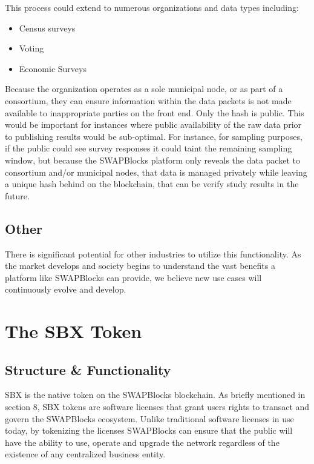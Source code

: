 \documentclass[12pt]{article}
\begin{document}
This process could extend to numerous organizations and data types including:

\begin{itemize}
	\item{Census surveys}
	\item{Voting}
	\item{Economic Surveys}
\end{itemize}

Because the organization operates as a sole municipal node, or as part of a consortium, they can ensure information within 
the data packets is not made available to inappropriate parties on the front end. Only the hash is public. This would be 
important for instances where public availability of the raw data prior to publishing results would be sub-optimal. For instance, 
for sampling purposes, if the public could see survey responses it could taint the remaining sampling window, but because the SWAPBlocks 
platform only reveals the data packet to consortium and/or municipal nodes, that data is managed privately while leaving 
a unique hash behind on the blockchain, that can be verify study results in the future. 

\subsection{Other}

There is significant potential for other industries to utilize this functionality. As the market develops and society begins to understand the vast benefits a platform like SWAPBlocks can provide, we believe new use cases will continuously evolve and develop.

\section{The SBX Token}

\subsection{Structure \& Functionality}
SBX is the native token on the SWAPBlocks blockchain. As briefly mentioned in section 8, SBX tokens are software licenses that grant users rights to transact and govern the SWAPBlocks ecosystem. Unlike traditional software licenses in use today, by tokenizing the licenses SWAPBlocks can ensure that the public will have the ability to use, operate and upgrade the network regardless of the existence of any centralized business entity.
\end{document}
